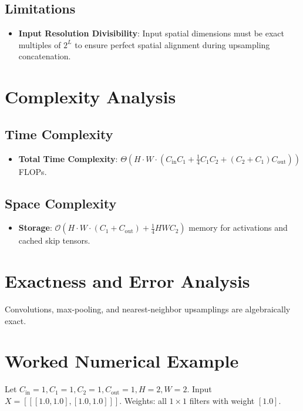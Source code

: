 \documentclass[11pt,a4paper]{article}
\theoremstyle{definition}
\begin{document}
\subsection{Limitations}
\begin{itemize}
    \item \textbf{Input Resolution Divisibility}: Input spatial dimensions must be exact multiples of $2^L$ to ensure perfect spatial alignment during upsampling concatenation.
\end{itemize}

\section{Complexity Analysis}

\subsection{Time Complexity}
\begin{itemize}
    \item \textbf{Total Time Complexity}: $\Theta(H \cdot W \cdot (C_{\text{in}} C_1 + \frac{1}{4} C_1 C_2 + (C_2 + C_1) C_{\text{out}}))$ FLOPs.
\end{itemize}

\subsection{Space Complexity}
\begin{itemize}
    \item \textbf{Storage}: $\mathcal{O}(H \cdot W \cdot (C_1 + C_{\text{out}}) + \frac{1}{4} H W C_2)$ memory for activations and cached skip tensors.
\end{itemize}

\section{Exactness and Error Analysis}

Convolutions, max-pooling, and nearest-neighbor upsamplings are algebraically exact.

\section{Worked Numerical Example}

Let $C_{\text{in}} = 1, C_1 = 1, C_2 = 1, C_{\text{out}} = 1, H = 2, W = 2$.
Input $X = [[[1.0, 1.0], [1.0, 1.0]]]$.
Weights: all $1 \times 1$ filters with weight $[1.0]$.
\end{document}
